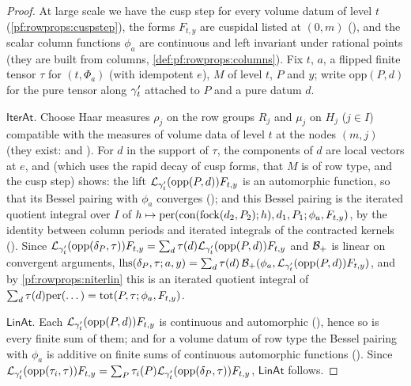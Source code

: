 \begin{proof}
At large scale we have the cusp step for every volume datum of level $t$ (\cref{pf:rowprops:cuspstep}), the forms $F_{t,y}$
are cuspidal listed at $(0,m)$ (), and the scalar column
functions $\phi_a$ are continuous and left invariant under rational points (they are built from columns,
\cref{def:pf:rowprops:columns}). Fix $t$, $a$, a flipped finite tensor $\tau$ for $(t,\Phi_a)$ (with idempotent $e$), $M$ of
level $t$, $P$ and $y$; write $\mathrm{opp}(P,d)$ for the pure tensor along $\gamma'_t$ attached to $P$ and a pure datum $d$.

$\mathsf{IterAt}$. Choose Haar measures $\rho_j$ on the row groups $R_j$ and $\mu_j$ on $H_j$ ($j\in I$) compatible with the
measures of volume data of level $t$ at the nodes $(m,j)$ (they exist:  and
). For $d$ in the support of $\tau$, the components of $d$ are local vectors at
$e$, and  (which uses the rapid decay of cusp forms, that $M$ is of row type, and
the cusp step) shows: the lift $\mathcal{L}_{\gamma'_t}(\mathrm{opp}(P,d))F_{t,y}$ is an automorphic function, so that its
Bessel pairing with $\phi_a$ converges (); and this Bessel pairing is the
iterated quotient integral over $I$ of $h\mapsto\mathrm{per}(\mathrm{con}(\mathrm{fock}(d_2,P_2);h),d_1,P_1;\phi_a,F_{t,y})$, by
the identity between column periods and iterated integrals of the contracted kernels
(). Since $\mathcal{L}_{\gamma'_t}(\mathrm{opp}(\delta_P,\tau))F_{t,y}=
\sum_d\tau(d)\mathcal{L}_{\gamma'_t}(\mathrm{opp}(P,d))F_{t,y}$ and $\mathcal{B}_+$ is linear on convergent arguments,
$\mathrm{lhs}(\delta_P,\tau;a,y)=\sum_d\tau(d)\,\mathcal{B}_+(\phi_a,\mathcal{L}_{\gamma'_t}(\mathrm{opp}(P,d))F_{t,y})$, and by
\cref{pf:rowprops:niterlin} this is an iterated quotient integral of $\sum_d\tau(d)\mathrm{per}(\dots)=\mathrm{tot}(P,\tau;\phi_a,F_{t,y})$.

$\mathsf{LinAt}$. Each $\mathcal{L}_{\gamma'_t}(\mathrm{opp}(P,d))F_{t,y}$ is continuous and automorphic
(), hence so is every finite sum of them; and for a volume datum of row type the
Bessel pairing with $\phi_a$ is additive on finite sums of continuous automorphic functions
(). Since $\mathcal{L}_{\gamma'_t}(\mathrm{opp}(\tau_i,\tau))F_{t,y}=
\sum_P\tau_i(P)\mathcal{L}_{\gamma'_t}(\mathrm{opp}(\delta_P,\tau))F_{t,y}$, $\mathsf{LinAt}$ follows.
\end{proof}

